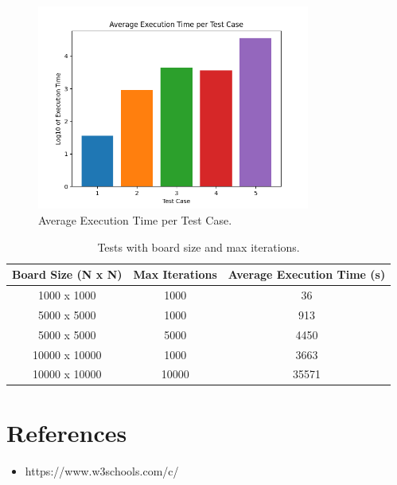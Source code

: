 \documentclass{article}
\begin{document}
\begin{figure}[t]
    \centering
    \includegraphics[width=0.8\textwidth]{average_execution_time_per_test_case}
    \caption{Average Execution Time per Test Case.}
    \label{figure1}
\end{figure}

	
	\begin{table}[t]
		\centering
		\begin{tabular}{|c|c|c|}
			\hline
			\textbf{Board Size (N x N)} & \textbf{Max Iterations} & \textbf{Average Execution Time (s)} \\
			\hline
			1000 x 1000 & 1000 & 36 \\
			5000 x 5000 & 1000 & 913 \\
			5000 x 5000 & 5000 & 4450 \\
			10000 x 10000 & 1000 & 3663 \\
			10000 x 10000 & 10000 & 35571 \\
			\hline
		\end{tabular}
		\caption{Tests with board size and max iterations.}
		\label{table2}
	\end{table}
	
	\section{References}
	\begin{itemize}
		\item https://www.w3schools.com/c/
	\end{itemize}
	
\end{document}
